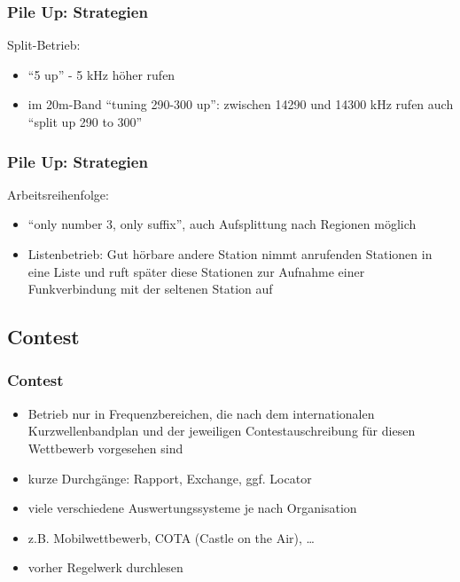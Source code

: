 \begin{frame}
  \frametitle{Pile Up: Strategien}

  Split-Betrieb:

  \begin{itemize}
    \item ``5 up'' - 5 kHz höher rufen
    \item im 20m-Band ``tuning 290-300 up'': zwischen 14290 und 14300 kHz rufen
      auch ``split up 290 to 300''
  \end{itemize}

\end{frame}

\begin{frame}
  \frametitle{Pile Up: Strategien}

  Arbeitsreihenfolge:

  \begin{itemize}
    \item ``only number 3, only suffix'', auch Aufsplittung nach Regionen möglich
    \item Listenbetrieb: Gut hörbare andere Station nimmt anrufenden
      Stationen in eine Liste und ruft später diese Stationen zur Aufnahme
      einer Funkverbindung mit der seltenen Station auf
  \end{itemize}

\end{frame}

\subsection{Contest}

\begin{frame}
  \frametitle{Contest}


  \begin{itemize}
    \item Betrieb nur in Frequenzbereichen, die nach dem internationalen
      Kurzwellenbandplan und der jeweiligen Contestauschreibung für diesen
      Wettbewerb vorgesehen sind
    \item kurze Durchgänge: Rapport, Exchange, ggf. Locator
    \item viele verschiedene Auswertungssysteme je nach Organisation
    \item z.B. Mobilwettbewerb, COTA (Castle on the Air), \dots
    \item vorher Regelwerk durchlesen
  \end{itemize}

\end{frame}

